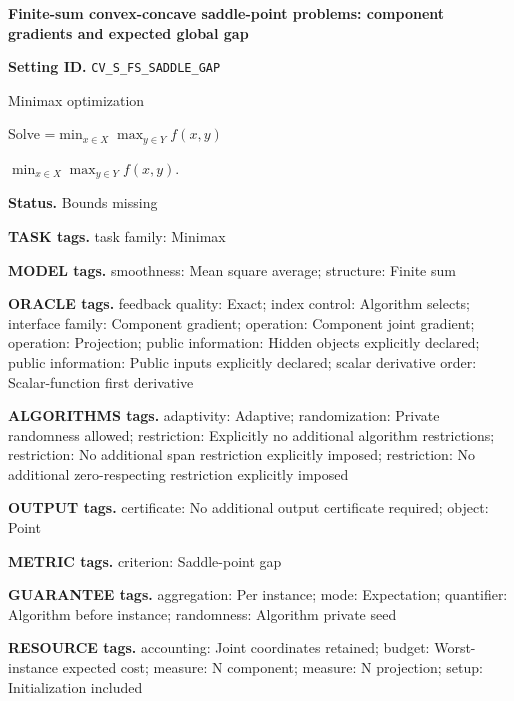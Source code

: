\documentclass[10pt,a4paper]{article}
\newcommand{\AtlasMath}[1]{\par\begingroup\centering\setbox0=\hbox{$\displaystyle #1$}\ifdim\wd0>1.4\linewidth\typeout{ATLAS WIDE FORMULA: \the\wd0}\fi\ifdim\wd0>\linewidth\resizebox{\linewidth}{!}{\box0}\else\box0\fi\par\endgroup}
\newcommand{\AtlasInlineMath}[1]{\begingroup\setbox0=\hbox{$#1$}\ifdim\wd0>.4\linewidth\endgroup\AtlasMath{#1}\else\endgroup$#1$\fi}
\begin{document}
\raggedright

{\LARGE\bfseries\sffamily\color{AtlasNavy} Finite-sum convex-concave saddle-point problems: component gradients and expected global gap\par}\vspace{5pt}


\textbf{Setting ID.} \texttt{CV\_\allowbreak{}S\_\allowbreak{}FS\_\allowbreak{}SADDLE\_\allowbreak{}GAP}



Minimax optimization



Solve \AtlasInlineMath{\min_{x\in X}\max_{y\in Y}f(x,y)}.



\textbf{Status.} Bounds missing



\textbf{TASK tags.} task family: Minimax



\textbf{MODEL tags.} smoothness: Mean square average; structure: Finite sum



\textbf{ORACLE tags.} feedback quality: Exact; index control: Algorithm selects; interface family: Component gradient; operation: Component joint gradient; operation: Projection; public information: Hidden objects explicitly declared; public information: Public inputs explicitly declared; scalar derivative order: Scalar-function first derivative



\textbf{ALGORITHMS tags.} adaptivity: Adaptive; randomization: Private randomness allowed; restriction: Explicitly no additional algorithm restrictions; restriction: No additional span restriction explicitly imposed; restriction: No additional zero-respecting restriction explicitly imposed



\textbf{OUTPUT tags.} certificate: No additional output certificate required; object: Point



\textbf{METRIC tags.} criterion: Saddle-point gap



\textbf{GUARANTEE tags.} aggregation: Per instance; mode: Expectation; quantifier: Algorithm before instance; randomness: Algorithm private seed



\textbf{RESOURCE tags.} accounting: Joint coordinates retained; budget: Worst-instance expected cost; measure: N component; measure: N projection; setup: Initialization included
\end{document}
